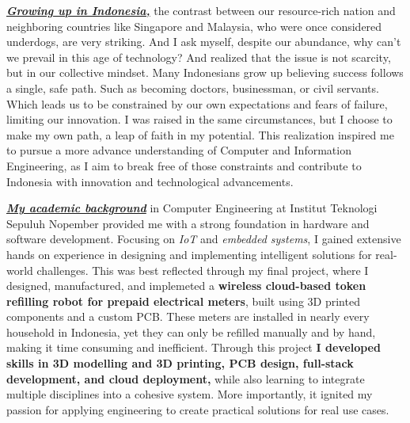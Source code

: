 \underline{\textit{\textbf{Growing up in Indonesia,}}} the contrast between our resource-rich nation and neighboring countries 
like Singapore and Malaysia, 
who were once considered underdogs, are very striking. And I ask myself, despite our abundance, why can't we prevail in this
age of technology? And realized that the issue is not scarcity, but in our collective mindset. Many Indonesians grow up believing
success follows a single, safe path. Such as becoming doctors, businessman, or civil servants. Which leads us to be constrained
by our own expectations and fears of failure, limiting our innovation. I was raised in the same circumstances, but I choose to
make my own path, a leap of faith in my potential. This realization inspired me to pursue a more advance understanding of Computer and 
Information Engineering, as I aim to break free of those constraints and contribute to Indonesia with innovation and technological advancements.

\underline{\textit{\textbf{My academic background}}} in Computer Engineering at Institut Teknologi Sepuluh Nopember provided
me with a strong foundation in hardware and software development. Focusing on \textit{IoT} and \textit{embedded systems}, I gained
extensive hands on experience in designing and implementing intelligent solutions for real-world challenges. This was best reflected through 
my final project, where I designed, manufactured, and implemeted a \textbf{wireless cloud-based token refilling robot for prepaid electrical meters}, 
built using 3D printed components and a custom PCB. These meters are installed in nearly every household in Indonesia,
yet they can only be refilled manually and by hand, making it time consuming and inefficient. Through this project \textbf{I developed skills in
3D modelling and 3D printing, PCB design, full-stack development, and cloud deployment,} while also learning to integrate multiple disciplines into
a cohesive system. More importantly, it ignited my passion for applying engineering to create practical solutions for real use cases.

